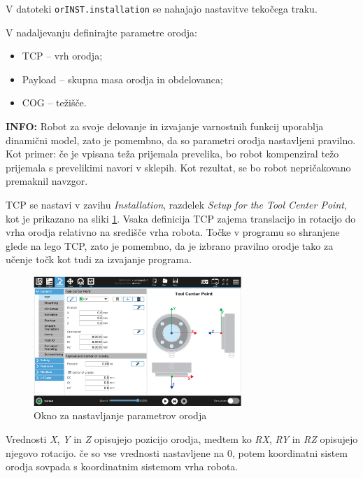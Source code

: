 V datoteki \verb"orINST.installation" se nahajajo nastavitve tekočega traku.

V nadaljevanju definirajte parametre orodja:
\begin{itemize}
  \item TCP -- vrh orodja;
  \item Payload -- skupna masa orodja in obdelovanca;
  \item COG -- težišče.
\end{itemize}

\begin{mdframed}[backgroundcolor=blue!20, shadow=true,roundcorner=8pt]
\textbf{INFO:} Robot za svoje delovanje in izvajanje varnostnih funkcij uporablja dinamični model, zato je pomembno, da so parametri orodja nastavljeni pravilno. Kot primer: če je vpisana teža prijemala prevelika, bo robot kompenziral težo prijemala s prevelikimi navori v sklepih. Kot rezultat, se bo robot nepričakovano premaknil navzgor.
\end{mdframed}


TCP se nastavi v zavihu \emph{Installation}, razdelek \emph{Setup for the Tool Center Point}, kot je prikazano na sliki \ref{fig:ur_install}. Vsaka definicija TCP zajema translacijo in rotacijo do vrha orodja relativno na središče vrha robota. Točke v programu so shranjene glede na lego TCP, zato je pomembno, da je izbrano pravilno orodje tako za učenje točk kot tudi za izvajanje programa.

\begin{figure}[!hbt]
\centering
 \includegraphics[width=0.7\textwidth]{ur5e_tcp.eps}
\caption{Okno za nastavljanje parametrov orodja}
\label{fig:ur_install}
\end{figure}


Vrednosti \emph{X}, \emph{Y} in \emph{Z} opisujejo pozicijo orodja, medtem ko \emph{RX}, \emph{RY} in \emph{RZ} opisujejo njegovo rotacijo. če so vse vrednosti nastavljene na 0, potem koordinatni sistem orodja sovpada s koordinatnim sistemom vrha robota.


